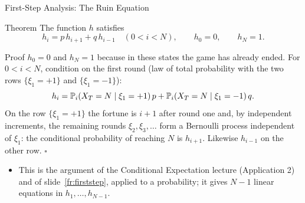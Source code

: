 \begin{frame}{First-Step Analysis: The Ruin Equation}
  \label{fr:ruineq}
  \small
  \begin{block}{Theorem}
    The function $h$ satisfies
    \[
      h_i=p\,h_{i+1}+q\,h_{i-1}\quad(0<i<N),\qquad h_0=0,\qquad h_N=1 .
    \]
  \end{block}
  \begin{block}{Proof}
    $h_0=0$ and $h_N=1$ because in these states the game has already ended. For $0<i<N$, condition on the first round (law of total probability with the two rows $\{\xi_1=+1\}$ and $\{\xi_1=-1\}$):
    \[
      h_i=\mathbb{P}_i(X_T=N\mid\xi_1=+1)\,p+\mathbb{P}_i(X_T=N\mid\xi_1=-1)\,q .
    \]
    On the row $\{\xi_1=+1\}$ the fortune is $i+1$ after round one and, by independent increments, the remaining rounds $\xi_2,\xi_3,\dots$ form a Bernoulli process independent of $\xi_1$: the conditional probability of reaching $N$ is $h_{i+1}$. Likewise $h_{i-1}$ on the other row. \hfill$\square$
  \end{block}
  \begin{itemize}
    \item This is the argument of the Conditional Expectation lecture (Application 2) and of slide~\ref{fr:firststep}, applied to a probability; it gives $N-1$ linear equations in $h_1,\dots,h_{N-1}$.
  \end{itemize}
\end{frame}

